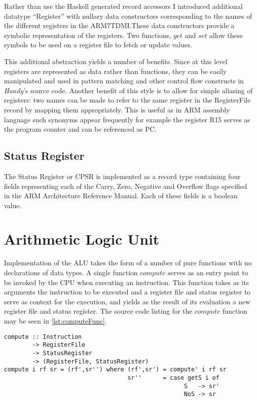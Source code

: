 Rather than use the Haskell generated record accessors I introduced additional datatype ``Register'' with nullary data constructors corresponding to the names of the different registers in the ARM7TDMI.\@ These data constructors provide a symbolic representation of the registers. Two functions, $get$ and $set$ allow these symbols to be used on a register file to fetch or update values.

This additional abstraction yields a number of benefits. Since at this level registers are represented as data rather than functions, they can be easily manipulated and used in pattern matching and other control flow constructs in \emph{Handy}'s source code. Another benefit of this style is to allow for simple aliasing of registers: two names can be made to refer to the same register in the RegisterFile record by mapping them appropriately. This is useful as in ARM assembly language such synonyms appear frequently for example the register R15 serves as the program counter and can be referenced as PC.

\subsection{Status Register}
\label{subsec:cpsr}
The Status Register or CPSR is implemented as a record type containing four fields representing each of the Carry, Zero, Negative and Overflow flags specified in the ARM Architecture Reference Manual\citep[pp. A3-29]{armarm:2005}. Each of these fields is a boolean value.


\section{Arithmetic Logic Unit}
\label{sec:alu}

Implementation of the ALU takes the form of a number of pure functions with no declarations of data types. A single function $compute$ serves as an entry point to be invoked by the CPU when executing an instruction. This function takes as its arguments the instruction to be executed and a register file and status register to serve as context for the execution, and yields as the result of its evaluation a new register file and status register. The source code listing for the $compute$ function may be seen in \autoref{lst:computeFunc}.

\begin{lstlisting}[mathescape,numbers=none,caption={The $compute$ function},label={lst:computeFunc}]
compute :: Instruction
        -> RegisterFile
        -> StatusRegister
        -> (RegisterFile, StatusRegister)
compute i rf sr = (rf',sr'') where (rf',sr') = compute' i rf sr
                                   sr''      = case getS i of
                                                   S   -> sr'
                                                   NoS -> sr
\end{lstlisting}

